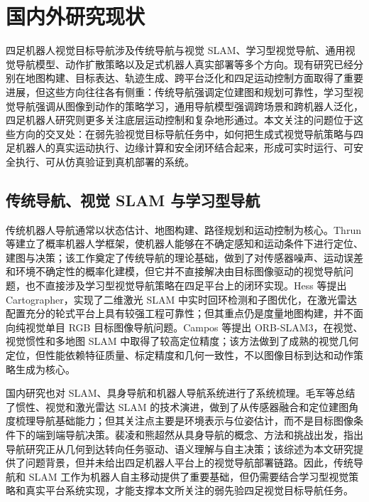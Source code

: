 \section{国内外研究现状}

四足机器人视觉目标导航涉及传统导航与视觉 SLAM、学习型视觉导航、通用视觉导航模型、动作扩散策略以及足式机器人真实部署等多个方向。现有研究已经分别在地图构建、目标表达、轨迹生成、跨平台泛化和四足运动控制方面取得了重要进展，但这些方向往往各有侧重：传统导航强调定位建图和规划可靠性，学习型视觉导航强调从图像到动作的策略学习，通用导航模型强调跨场景和跨机器人泛化，四足机器人研究则更多关注底层运动控制和复杂地形通过。本文关注的问题位于这些方向的交叉处：在弱先验视觉目标导航任务中，如何把生成式视觉导航策略与四足机器人的真实运动执行、边缘计算和安全闭环结合起来，形成可实时运行、可安全执行、可从仿真验证到真机部署的系统。

\subsection{传统导航、视觉 SLAM 与学习型导航}

传统机器人导航通常以状态估计、地图构建、路径规划和运动控制为核心。Thrun 等\cite{thrun2005probabilistic}建立了概率机器人学框架，使机器人能够在不确定感知和运动条件下进行定位、建图与决策；该工作奠定了传统导航的理论基础，做到了对传感器噪声、运动误差和环境不确定性的概率化建模，但它并不直接解决由目标图像驱动的视觉导航问题，也不直接涉及学习型视觉导航策略在四足平台上的闭环实现。Hess 等\cite{cartographer2016}提出 Cartographer，实现了二维激光 SLAM 中实时回环检测和子图优化，在激光雷达配置充分的轮式平台上具有较强工程可靠性；但其重点仍是度量地图构建，并不面向纯视觉单目 RGB 目标图像导航问题。Campos 等\cite{orbslam3_2021}提出 ORB-SLAM3，在视觉、视觉惯性和多地图 SLAM 中取得了较高定位精度；该方法做到了成熟的视觉几何定位，但性能依赖特征质量、标定精度和几何一致性，不以图像目标到达和动作策略生成为核心。

国内研究也对 SLAM、具身导航和机器人导航系统进行了系统梳理。毛军等\cite{mao2022slam_review}总结了惯性、视觉和激光雷达 SLAM 的技术演进，做到了从传感器融合和定位建图角度梳理导航基础能力；但其关注点主要是环境表示与位姿估计，而不是目标图像条件下的端到端导航决策。裴凌和熊超然\cite{pei2026embodied_nav}从具身导航的概念、方法和挑战出发，指出导航研究正从几何到达转向任务驱动、语义理解与自主决策；该综述为本文研究提供了问题背景，但并未给出四足机器人平台上的视觉导航部署链路。因此，传统导航和 SLAM 工作为机器人自主移动提供了重要基础，但仍需要结合学习型视觉策略和真实平台系统实现，才能支撑本文所关注的弱先验四足视觉目标导航任务。

